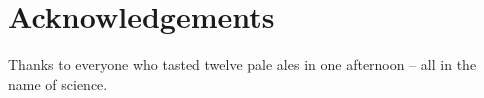 \chapter*{Acknowledgements}\label{cha:acknowledgement}
Thanks to everyone who tasted twelve pale ales in one afternoon -- all in the name of science.
